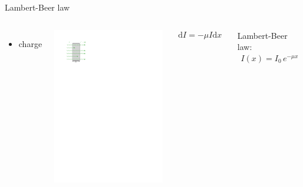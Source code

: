 \documentclass[11pt,xcolor=dvipsnames,professionalfonts]{beamer}
\begin{document}
\begin{frame}{Lambert-Beer law}
	\begin{columns}
			\begin{itemize}
				\item charge
			\end{itemize}
		
			\begin{center}
				\includegraphics{./figures/lambert_beer.pdf}
			\end{center}
			\begin{align*}
				\mathrm{d} I = - \mu I \mathrm{d}x
			\end{align*}
			
			Lambert-Beer law:
			\begin{align*}
				I(x) = I_0 \, e^{-\mu x}
			\end{align*}
	\end{columns}
\end{frame}
\end{document}
